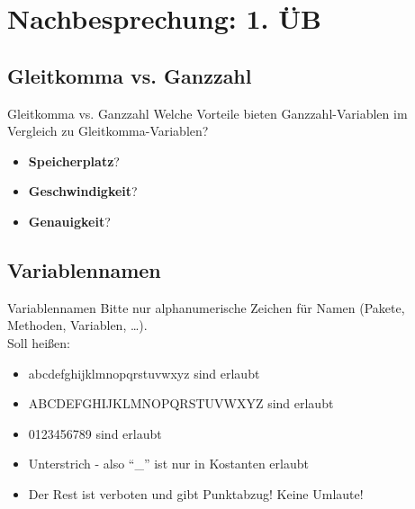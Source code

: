 \documentclass[usepdftitle=false,hyperref={pdfpagelabels=false}]{beamer}
\begin{document}
\section{Nachbesprechung: 1. ÜB}
\subsection{Gleitkomma vs. Ganzzahl}
\begin{frame}{Gleitkomma vs. Ganzzahl}
    Welche Vorteile bieten Ganzzahl-Variablen im Vergleich zu
    Gleitkomma-Variablen?
    \begin{itemize}[<+->]
        \item \textbf{Speicherplatz}? 
        \item \textbf{Geschwindigkeit}? 
        \item \textbf{Genauigkeit}? 
    \end{itemize}
\end{frame}

\subsection{Variablennamen}
\begin{frame}{Variablennamen}
    Bitte nur alphanumerische Zeichen für Namen (Pakete, Methoden, Variablen, \dots).\\
    Soll heißen:
    \begin{itemize}[<+->]
        \item abcdefghijklmnopqrstuvwxyz sind erlaubt
        \item ABCDEFGHIJKLMNOPQRSTUVWXYZ sind erlaubt
        \item 0123456789 sind erlaubt
        \item Unterstrich - also "`\_"' ist nur in Kostanten erlaubt
        \item Der Rest ist verboten und gibt Punktabzug! Keine Umlaute!
    \end{itemize}
\end{frame}
\end{document}
